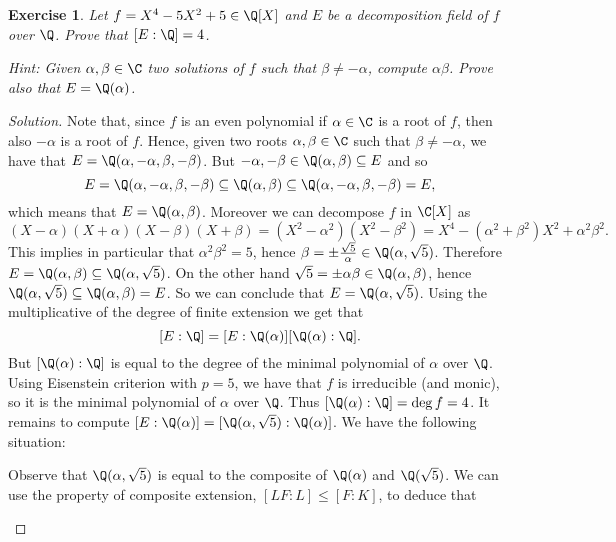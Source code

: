 \documentclass[a4paper,10pt,reqno]{amsart}
\newtheorem{ex}{Exercise}[section]
\newenvironment{sol}
  {\renewcommand\qedsymbol{$\blacksquare$}\begin{proof}[Solution]}
  {\end{proof}}
\begin{document}
\begin{ex}
\label{5.3}
    Let $f=X^4-5X^2+5\in \Q[X]$ and $E$ be a decomposition field of $f$ over $\Q$. 
    Prove that $[E:\Q]=4$. 

    \textit{Hint:}
    Given $\alpha,\beta\in \C$
    two solutions of $f$ such that $\beta\neq-\alpha$,
    compute $\alpha\beta$.
    Prove also that $E=\Q(\alpha)$.
\end{ex}
\begin{sol}
Note that, since $f$ is an even polynomial
if $\alpha\in \C$ is a root of $f$,
then also $-\alpha$ is a root of $f$.
 Hence, given two roots $\alpha,\beta\in \C$
 such that $\beta\neq-\alpha$,
we have that $E=\Q(\alpha,-\alpha,\beta,-\beta)$.
 But $-\alpha,-\beta\in \Q(\alpha,\beta)\subseteq E$
 and so 
\[
 E=\Q(\alpha,-\alpha,\beta,-\beta)\subseteq \Q(\alpha,\beta)\subseteq\Q(\alpha,-\alpha,\beta,-\beta)=E,
 \]
 which means that $E=\Q(\alpha,\beta)$.
 Moreover we can decompose $f$ in $\C[X]$ as 
 \[
 (X-\alpha)(X+\alpha)(X-\beta)(X+\beta)=(X^2-\alpha^2)(X^2-\beta^2)=X^4-(\alpha^2+\beta^2)X^2+\alpha^2\beta^2.
 \]
This implies in particular that $\alpha^2\beta^2=5$, hence $\beta=\pm \frac{\sqrt{5}}{\alpha}\in \Q(\alpha,\sqrt{5})$.
Therefore $E=\Q(\alpha,\beta)\subseteq \Q(\alpha,\sqrt{5})$.
On the other hand $\sqrt{5}=\pm\alpha\beta\in\Q(\alpha,\beta)$,
 hence $\Q(\alpha,\sqrt{5})\subseteq\Q(\alpha,\beta)=E$.
 So we can conclude that $E=\Q(\alpha,\sqrt{5})$.
Using the multiplicative of the degree of finite extension we get that
 \[
 [E:\Q]=[E:\Q(\alpha)][\Q(\alpha):\Q].
\]
But $[\Q(\alpha):\Q]$ is equal to the degree of the minimal
polynomial of $\alpha$ over $\Q$.
 Using Eisenstein criterion with $p=5$, we have that $f$ is irreducible (and monic), so it is the minimal polynomial of $\alpha$ over $\Q$.
Thus $[\Q(\alpha):\Q]=\deg f=4$.
It remains to compute $[E:\Q(\alpha)]=[\Q(\alpha,\sqrt{5}):\Q(\alpha)]$.
 We have the following situation:
\begin{multicols}{2}
 \vfill\null
 \columnbreak
 Observe that $\Q(\alpha,\sqrt{5})$ is equal to the composite of $\Q(\alpha)$ and $\Q(\sqrt{5})$.
 We can use the property of composite extension,
$[LF:L]\leq[F:K]$, to deduce that 

\end{multicols}
\end{sol}
\end{document}
